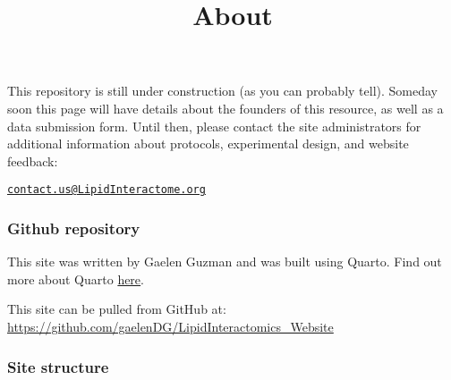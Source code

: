 \documentclass[
  letterpaper,
  DIV=11,
  numbers=noendperiod]{scrartcl}
\title{About}
\author{}
\date{}
\begin{document}
\maketitle


This repository is still under construction (as you can probably tell).
Someday soon this page will have details about the founders of this
resource, as well as a data submission form. Until then, please contact
the site administrators for additional information about protocols,
experimental design, and website feedback:

\href{mailto:contact.us@LipidInteractome.org}{\nolinkurl{contact.us@LipidInteractome.org}}

\subsubsection{Github repository}\label{github-repository}

This site was written by Gaelen Guzman and was built using Quarto. Find
out more about Quarto \href{https://quarto.org}{here}.

This site can be pulled from GitHub at:
\url{https://github.com/gaelenDG/LipidInteractomics_Website}

\subsubsection{Site structure}\label{site-structure}
\end{document}
